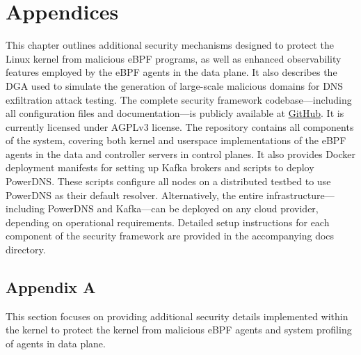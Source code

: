 \documentclass [11pt, proquest] {uwthesis}[2020/02/24]
\begin{document}
 




\chapter{Appendices}

This chapter outlines additional security mechanisms designed to protect the Linux kernel from malicious eBPF programs, as well as enhanced observability features employed by the eBPF agents in the data plane. It also describes the DGA used to simulate the generation of large-scale malicious domains for DNS exfiltration attack testing.
The complete security framework codebase—including all configuration files and documentation—is publicly available at \href{https://github.com/Synarcs/DNSObelisk}{GitHub}. It is currently licensed under AGPLv3 license.
The repository contains all components of the system, covering both kernel and userspace implementations of the eBPF agents in the data and controller servers in control planes. It also provides Docker deployment manifests for setting up Kafka brokers and scripts to deploy PowerDNS. These scripts configure all nodes on a distributed testbed to use PowerDNS as their default resolver. Alternatively, the entire infrastructure—including PowerDNS and Kafka—can be deployed on any cloud provider, depending on operational requirements.
Detailed setup instructions for each component of the security framework are provided in the accompanying docs directory.

\section{Appendix A}
This section focuses on providing additional security details implemented within the kernel to protect the kernel from malicious eBPF agents and system profiling of agents in data plane.
\end{document}
